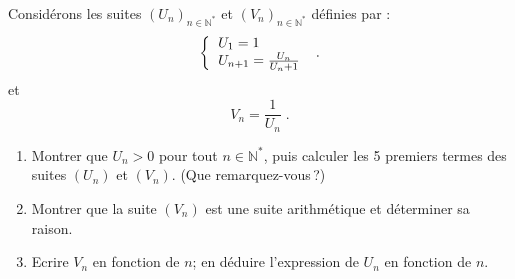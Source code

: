 \begin{exo}\label{exo:suite-5}
Consid\'erons les suites $(U_n)_{n \in \mathbb{N}^*}$ et $(V_n)_{n \in \mathbb{N}^*}$ d\'efinies par :
\[
\left\lbrace
\begin{tabular}{l}
$U_1 = 1$ \\
$U_{n+1} = \frac{U_n}{U_n + 1}$
\end{tabular}
\right. \; .
\]
et 
$$
V_n = \frac{1}{U_n} \; .
$$
\begin{enumerate}
      \item Montrer que $U_n > 0$ pour tout $n \in \mathbb{N}^*$, puis calculer les 5 premiers termes des suites $(U_n)$ et $(V_n)$. (Que remarquez-vous\,?)
      \item Montrer que la suite $(V_n)$ est une suite arithm\'etique et d\'eterminer sa raison.
      \item Ecrire $V_n$ en fonction de $n$; en d\'eduire l'expression de $U_n$ en fonction de $n$.
\end{enumerate}
\end{exo}
%
%
